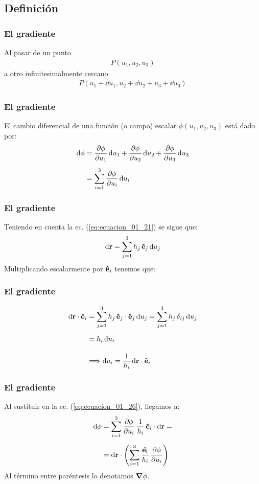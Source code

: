 \documentclass[12pt]{beamer}
\begin{document}
\subsection{Definición}
\begin{frame}
\frametitle{El gradiente}
Al pasar de un punto 
\begin{align*}
P(u_{1}, u_{2}, u_{3})
\end{align*}
a otro infinitesimalmente cercano 
\begin{align*}
P(u_{1} + \dd{u}_{1}, u_{2} + \dd{u_{2}} + u_{3} + \dd{u_{3}})
\end{align*}
\end{frame}
\begin{frame}
\frametitle{El gradiente}
El cambio diferencial de una función (o campo) escalar $\phi(u_{1}, u_{2}, u_{3})$ está dado por:
\begin{align}
\begin{aligned}
\dd{\phi} &= \pdv{\phi}{u_{1}} \dd{u_{1}} + \pdv{\phi}{u_{2}} \dd{u_{2}} + \pdv{\phi}{u_{3}} \dd{u_{3}} \\[0.5em]
&= \sum_{i=1}^{3} \pdv{\phi}{u_{i}} \dd{u_{i}}
\end{aligned}
\label{eq:ecuacion_01_26}
\end{align}
\end{frame}
\begin{frame}
\frametitle{El gradiente}
Teniendo en cuenta la ec. (\ref{eq:ecuacion_01_21}) se sigue que:
\begin{align}
\dd{\vb{r}} = \sum_{j=1}^{3} h_{j} \, \vu{e}_{j} \dd{u_{j}}
\label{eq:ecuacion_01_27}
\end{align}
\pause
Multiplicando escalarmente por $\vu{e}_{i}$ tenemos que:
\end{frame}
\begin{frame}
\frametitle{El gradiente}
\begin{align*}
\dd{\vb{r}} \cdot \vu{e}_{i} &= \sum_{j=1}^{3} h_{j} \, \vu{e}_{j} \cdot \vu{e}_{j} \dd{u_{j}} = \sum_{j=1}^{3} h_{j} \, \delta_{ij} \dd{u_{j}} \\[0.5em]
&= h_{i} \dd{u_{i}} \\[1em]
&\Longrightarrow \dd{u_{i}} = \dfrac{1}{h_{i}} \dd{\vb{r}} \cdot \vu{e}_{i}
\end{align*}
\end{frame}
\begin{frame}
\frametitle{El gradiente}
Al sustituir en la ec. (\ref{eq:ecuacion_01_26}), llegamos a:
\begin{align*}
\dd{\phi} &= \sum_{i=1}^{3} \pdv{\phi}{u_{i}} \, \dfrac{1}{h_{i}} \, \vu{e}_{i} \cdot \dd{\vb{r}} = \\[0.5em]
&= \dd{\vb{r}} \cdot \left( \sum_{i=1}^{3} \dfrac{\vu{e_{i}}}{h_{i}} \, \pdv{\phi}{u_{i}} \right)
\end{align*}
\pause
Al término entre paréntesis lo denotamos $\grad{\phi}$.
\end{frame}
\end{document}
